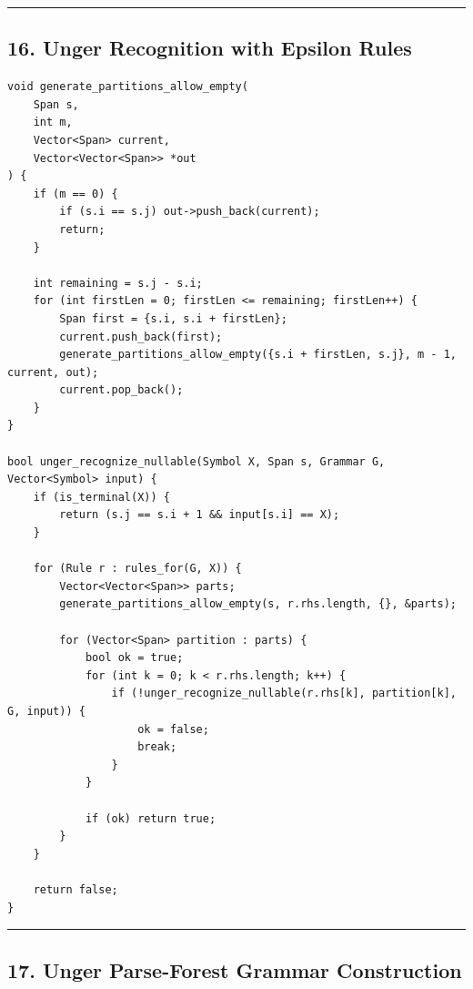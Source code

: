 \documentclass[10pt,letterpaper]{article}
\begin{document}
\medskip\hrule\medskip

\subsection*{16. Unger Recognition with Epsilon Rules}

\begin{verbatim}
void generate_partitions_allow_empty(
    Span s,
    int m,
    Vector<Span> current,
    Vector<Vector<Span>> *out
) {
    if (m == 0) {
        if (s.i == s.j) out->push_back(current);
        return;
    }

    int remaining = s.j - s.i;
    for (int firstLen = 0; firstLen <= remaining; firstLen++) {
        Span first = {s.i, s.i + firstLen};
        current.push_back(first);
        generate_partitions_allow_empty({s.i + firstLen, s.j}, m - 1, current, out);
        current.pop_back();
    }
}

bool unger_recognize_nullable(Symbol X, Span s, Grammar G, Vector<Symbol> input) {
    if (is_terminal(X)) {
        return (s.j == s.i + 1 && input[s.i] == X);
    }

    for (Rule r : rules_for(G, X)) {
        Vector<Vector<Span>> parts;
        generate_partitions_allow_empty(s, r.rhs.length, {}, &parts);

        for (Vector<Span> partition : parts) {
            bool ok = true;
            for (int k = 0; k < r.rhs.length; k++) {
                if (!unger_recognize_nullable(r.rhs[k], partition[k], G, input)) {
                    ok = false;
                    break;
                }
            }

            if (ok) return true;
        }
    }

    return false;
}
\end{verbatim}

\medskip\hrule\medskip

\subsection*{17. Unger Parse-Forest Grammar Construction}
\end{document}
